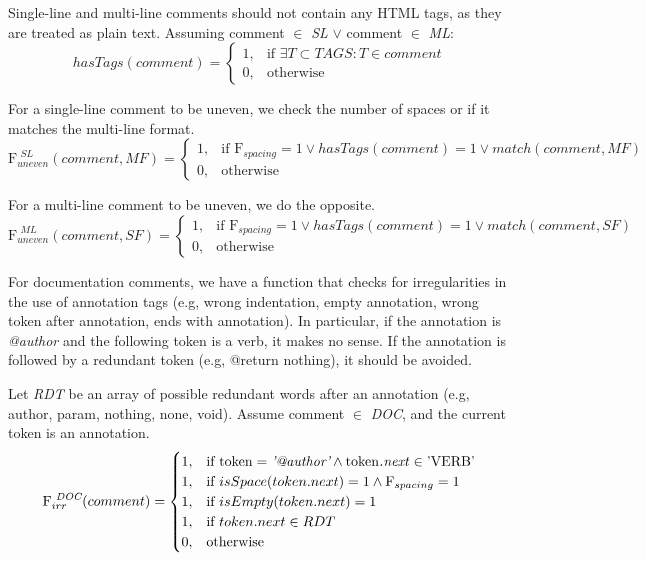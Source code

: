 \noindent Single-line and multi-line comments should not contain any HTML tags, as they are treated as plain text.
Assuming comment $\in$ \textit{SL} $\vee$ comment $\in$ \textit{ML}:
\begin{equation*}
	hasTags(comment) = \begin{cases}
		1, & \text{if } \exists T \subset TAGS : T \in comment \\
		0, & \text{otherwise}
	\end{cases}
\end{equation*}

\noindent For a single-line comment to be uneven, we check the number of spaces or if it matches the multi-line format.
\begin{equation*}
	\mathrm{F}_{uneven}^{\textit{ SL}}(comment, MF) = \begin{cases}
		1, & \text{if } \mathrm{F}_{spacing} = 1 \vee hasTags(comment) = 1 \vee match(comment, MF) \\
		0, & \text{otherwise}
	\end{cases}
\end{equation*}

\noindent For a multi-line comment to be uneven, we do the opposite.
\begin{equation*}
	\mathrm{F}_{uneven}^{\textit{ ML}}(comment, SF) = \begin{cases}
		1, & \text{if } \mathrm{F}_{spacing} = 1 \vee hasTags(comment) = 1 \vee match(comment, SF) \\
		0, & \text{otherwise}
	\end{cases}
\end{equation*}

\noindent For documentation comments, we have a function that checks for irregularities in the use of annotation tags (e.g, wrong indentation, empty annotation, wrong token after annotation, ends with annotation). In particular, if the annotation is \textit{@author} and the following token is a verb, it makes no sense. If the annotation is followed by a redundant token (e.g, @return nothing), it should be avoided.

\noindent Let \textit{RDT} be an array of possible redundant words after an annotation (e.g, author, param, nothing, none, void).
Assume comment $\in$ \textit{DOC}, and the current token is an annotation.
\begin{equation*}
	\mathrm{F}_{irr}^{\textit{ DOC}}(comment) = \begin{cases}
		1, & \text{if } \text{token} = \textit{'@author'} \wedge \text{token\textit{.next}} \in \text{'VERB'} \\
		1, & \text{if } isSpace(token.next) = 1 \wedge \mathrm{F}_{spacing} = 1 \\
		1, & \text{if } isEmpty(token.next) = 1 \\
		1, & \text{if } token.next \in RDT \\
		0, & \text{otherwise}
	\end{cases}
\end{equation*}
